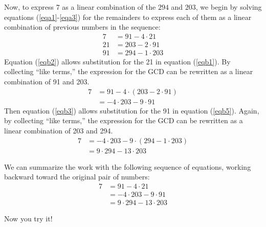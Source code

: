 \documentclass[space,nooutcomes]{ximera}
\begin{document}
\begin{example}
\begin{solution}
Now, to express $7$ as a linear combination of the $294$ and $203$, we begin by solving equations (\ref{eqa1}-\ref{eqa3}) for the remainders to express each of them as a linear combination of previous numbers in the sequence:  
\begin{align}
\label{eqb1} 7 &=  91- 4\cdot 21 \\
\label{eqb2} 21 &= 203 - 2\cdot 91 \\
\label{eqb3} 91 &= 294 - 1\cdot 203
\end{align}
Equation (\ref{eqb2}) allows substitution for the 21 in equation (\ref{eqb1}).  By collecting ``like terms,'' the expression for the GCD can be rewritten as a linear combination of 91 and 203.
\begin{align}
\label{eqb4} 7 &= 91 -4\cdot (203 - 2\cdot 91) \\
\label{eqb5}   &= -4\cdot 203 - 9\cdot 91
\end{align} 
Then equation (\ref{eqb3}) allows substitution for the 91 in equation (\ref{eqb5}).  Again, by collecting ``like terms,'' the expression for the GCD can be rewritten as a linear combination of 203 and 294.
\begin{align}
\label{eqb6} 7 &= -4\cdot 203 - 9\cdot (294 - 1\cdot 203) \\
\label{eqb7}   &= 9\cdot 294 - 13\cdot 203
\end{align} 
\end{solution}
\end{example}

We can summarize the work with the following sequence of equations, working backward toward the original pair of numbers: 
\begin{align*}
 7 &=  91- 4\cdot 21 \\
    &= -4\cdot 203 - 9\cdot 91 \\
   &= 9\cdot 294 - 13\cdot 203
\end{align*}

Now you try it!  
\end{document}
